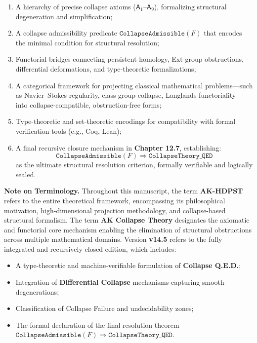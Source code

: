 \documentclass[11pt]{article}
\begin{document}
\begin{enumerate}
    \item A hierarchy of precise collapse axioms ($\mathsf{A}_1$–$\mathsf{A}_9$), formalizing structural degeneration and simplification;
    \item A collapse admissibility predicate $\texttt{CollapseAdmissible}(F)$ that encodes the minimal condition for structural resolution;
    \item Functorial bridges connecting persistent homology, Ext-group obstructions, differential deformations, and type-theoretic formalizations;
    \item A categorical framework for projecting classical mathematical problems—such as Navier–Stokes regularity, class group collapse, Langlands functoriality—into collapse-compatible, obstruction-free forms;
    \item Type-theoretic and set-theoretic encodings for compatibility with formal verification tools (e.g., Coq, Lean);
    \item A final recursive closure mechanism in \textbf{Chapter 12.7}, establishing:
    \[
    \boxed{
    \texttt{CollapseAdmissible}(F) \Rightarrow \texttt{CollapseTheory\_QED}
    }
    \]
    as the ultimate structural resolution criterion, formally verifiable and logically sealed.
\end{enumerate}

\vspace{1em}
\noindent\textbf{Note on Terminology.}  
Throughout this manuscript, the term \textbf{AK-HDPST} refers to the entire theoretical framework, encompassing its philosophical motivation, high-dimensional projection methodology, and collapse-based structural formalism.  
The term \textbf{AK Collapse Theory} designates the axiomatic and functorial core mechanism enabling the elimination of structural obstructions across multiple mathematical domains.  
Version \textbf{v14.5} refers to the fully integrated and recursively closed edition, which includes:
\begin{itemize}
    \item A type-theoretic and machine-verifiable formulation of \textbf{Collapse Q.E.D.};
    \item Integration of \textbf{Differential Collapse} mechanisms capturing smooth degenerations;
    \item Classification of Collapse Failure and undecidability zones;
    \item The formal declaration of the final resolution theorem $\texttt{CollapseAdmissible}(F) \Rightarrow \texttt{CollapseTheory\_QED}$.
\end{itemize}
\end{document}

